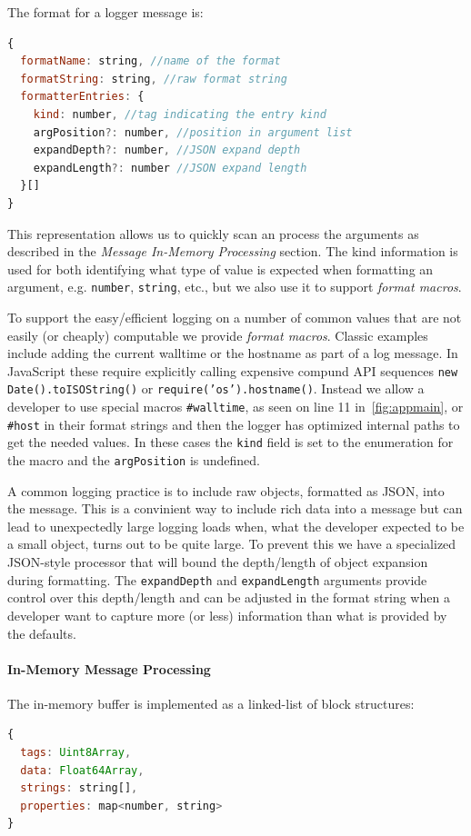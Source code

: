 The format for a logger message is:
\begin{lstlisting}[language=JavaScript,basicstyle=\scriptsize]
{
  formatName: string, //name of the format
  formatString: string, //raw format string
  formatterEntries: {
    kind: number, //tag indicating the entry kind
    argPosition?: number, //position in argument list
    expandDepth?: number, //JSON expand depth
    expandLength?: number //JSON expand length
  }[]
}
\end{lstlisting}

This representation allows us to quickly scan an process the arguments as 
described in the \emph{Message In-Memory Processing} section. The kind 
information is used for both identifying what type of value is expected 
when formatting an argument, e.g. \texttt{number}, \texttt{string}, etc., 
but we also use it to support \emph{format macros}.

To support the easy/efficient logging on a number of common values that 
are not easily (or cheaply) computable we provide \emph{format macros}. 
Classic examples include adding the current walltime or the hostname as 
part of a log message. In JavaScript these require explicitly calling 
expensive compund API sequences \texttt{new Date().toISOString()} or 
\texttt{require('os').hostname()}. Instead we allow a developer to use 
special macros \texttt{\#walltime}, as seen on line 11 in~\autoref{fig:appmain}, 
or \texttt{\#host} in their format 
strings and then the logger has optimized internal paths to get the needed 
values. In these cases the \texttt{kind} field is set to the enumeration 
for the macro and the \texttt{argPosition} is undefined.


A common logging practice is to include raw objects, formatted as JSON, into the 
message. This is a convinient way to include rich data into a message but can 
lead to unexpectedly large logging loads when, what the developer expected to 
be a small object, turns out to be quite large. To prevent this we have a specialized 
JSON-style processor that will bound the depth/length of object expansion during 
formatting. The \texttt{expandDepth} and \texttt{expandLength} arguments provide 
control over this depth/length and can be adjusted in the format string when a 
developer want to capture more (or less) information than what is provided by the 
defaults.

\paragraph{In-Memory Message Processing}
\noindent
The in-memory buffer is implemented as a linked-list of block structures:
\begin{lstlisting}[language=JavaScript,basicstyle=\scriptsize]
{
  tags: Uint8Array,
  data: Float64Array,
  strings: string[],
  properties: map<number, string>
}
\end{lstlisting}

